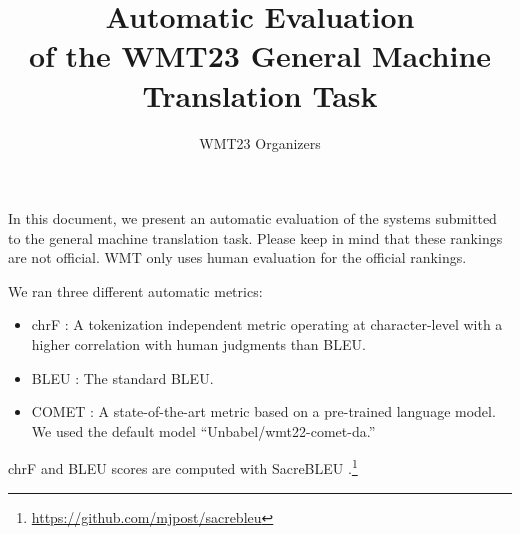 \documentclass[11pt]{article}
\title{Automatic Evaluation\\ of the WMT23 General Machine Translation Task}
\author{WMT23 Organizers}
\begin{document}
\maketitle

In this document, we present an automatic evaluation of the systems submitted to the general machine translation task. Please keep in mind that these rankings are not official. WMT only uses human evaluation for the official rankings.


We ran three different automatic metrics:
\begin{itemize}
\item chrF \citep{popovic-2015-chrf}: A tokenization independent metric operating at character-level with a higher correlation with human judgments than BLEU.
\item BLEU \citep{papineni-etal-2002-bleu}: The standard BLEU. 
\item COMET \citep{rei-etal-2020-comet}: A state-of-the-art metric based on a pre-trained language model. We used the default model ``Unbabel/wmt22-comet-da.''
\end{itemize}


chrF and BLEU scores are computed with SacreBLEU \citep{post-2018-call}.\footnote{\url{https://github.com/mjpost/sacrebleu}}
\end{document}
